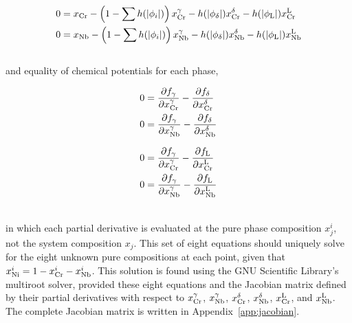 \documentclass[10pt]{article}
\begin{document}
		\begin{align}
			\label{eqn:Jf1}
			0 &= x_{\ce{Cr}} - \left( 1-\sum h(|\phi_i|) \right)x_{\ce{Cr}}^{\gamma}
			                 - h(|\phi_{\delta}|)x_{\ce{Cr}}^{\delta}
			                 - h(|\phi_{\ce{L}}|)x_{\ce{Cr}}^{\ce{L}}\\
			\label{eqn:Jf2}
			0 &= x_{\ce{Nb}} - \left( 1-\sum h(|\phi_i|) \right)x_{\ce{Nb}}^{\gamma}
			                 - h(|\phi_{\delta}|)x_{\ce{Nb}}^{\delta}
			                 - h(|\phi_{\ce{L}}|)x_{\ce{Nb}}^{\ce{L}}
		\end{align}\\
		and equality of chemical potentials for each phase,\\
		\begin{minipage}{0.45\textwidth}
		\begin{align}
			\label{eqn:Jf3}
			0 &= \frac{\partial f_{\gamma}}{\partial x_{\ce{Cr}}^{\gamma}} - \frac{\partial f_{\delta}}{\partial x_{\ce{Cr}}^{\delta}}\\
			\label{eqn:Jf4}
			0 &= \frac{\partial f_{\gamma}}{\partial x_{\ce{Nb}}^{\gamma}} - \frac{\partial f_{\delta}}{\partial x_{\ce{Nb}}^{\delta}}
		\end{align}
		\end{minipage}\qquad
		\begin{minipage}{0.45\textwidth}
		\begin{align}
			\label{eqn:Jf7}
			0 &= \frac{\partial f_{\gamma}}{\partial x_{\ce{Cr}}^{\gamma}} - \frac{\partial f_{\ce{L}}}{\partial x_{\ce{Cr}}^{\ce{L}}}\\
			\label{eqn:Jf8}
			0 &= \frac{\partial f_{\gamma}}{\partial x_{\ce{Nb}}^{\gamma}} - \frac{\partial f_{\ce{L}}}{\partial x_{\ce{Nb}}^{\ce{L}}}
		\end{align}
		\end{minipage}\\
		in which each partial derivative is evaluated at the pure phase composition $x_j^i$, not the system composition $x_j$.
		This set of eight equations should uniquely solve for the eight unknown pure compositions at each point,
		given that $x_{\ce{Ni}}^i = 1-x_{\ce{Cr}}^i-x_{\ce{Nb}}^i$.
		This solution is found using the GNU Scientific Library's multiroot solver, provided these eight equations and the
		Jacobian matrix defined by their partial derivatives with respect to $x_{\ce{Cr}}^{\gamma}$,
		                                                                     $x_{\ce{Nb}}^{\gamma}$,
		                                                                     $x_{\ce{Cr}}^{\delta}$,
		                                                                     $x_{\ce{Nb}}^{\delta}$,
		                                                                     $x_{\ce{Cr}}^{\ce{L}}$, and
		                                                                     $x_{\ce{Nb}}^{\ce{L}}$.
		The complete Jacobian matrix is written in Appendix~\ref{app:jacobian}.
\end{document}
